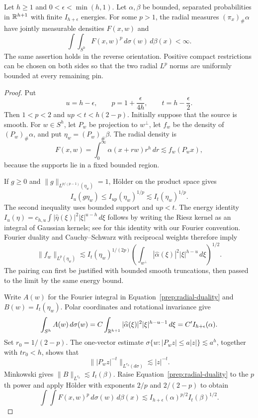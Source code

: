 \begin{lemma}\label{prep:radial-lp}
Let $h\ge1$ and $0<\epsilon<\min(h,1)$. Let $\alpha,\beta$ be
bounded, separated probabilities in $\mathbb R^{h+1}$ with finite
$I_{h+\epsilon}$ energies. For some $p>1$, the radial measures
$(\pi_x)_\#\alpha$ have jointly measurable densities $F(x,w)$ and
\[
 \int\!\int_{S^h}F(x,w)^p\,d\sigma(w)\,d\beta(x)<\infty.
\]
The same assertion holds in the reverse orientation. Positive compact
restrictions can be chosen on both sides so that the two radial
$L^p$ norms are uniformly bounded at every remaining pin.
\end{lemma}
\begin{proof}
Put
\[
 u=h-\epsilon,\qquad p=1+\frac{\epsilon}{4h},
 \qquad t=h-\frac{\epsilon}{2}.
\]
Then $1<p<2$ and $up<t<h(2-p)$. Initially suppose that the
source is smooth. For $w\in S^h$, let $P_w$ be projection to
$w^\perp$, let $f_w$ be the density of $(P_w)_\#\alpha$, and put
$\eta_w=(P_w)_\#\beta$. The radial density is
\[
 F(x,w)=\int_0^\infty\alpha(x+rw)r^h\,dr
 \lesssim f_w(P_wx),
\]
because the supports lie in a fixed bounded region.

If $g\ge0$ and $\|g\|_{L^{p/(p-1)}(\eta_w)}=1$, Hölder on the
product space gives
\[
 I_u(g\eta_w)\le I_{up}(\eta_w)^{1/p}
 \lesssim I_t(\eta_w)^{1/p}.
\]
The second inequality uses bounded support and $up<t$.
The energy identity
$I_u(\eta)=c_{h,u}\int|\widehat\eta(\xi)|^2|\xi|^{u-h}\,d\xi$
follows by writing the Riesz kernel as an integral of Gaussian
kernels; see \cite[Lemma~12.12]{Mattila1995} for this identity with
our Fourier convention. Fourier duality and Cauchy--Schwarz with reciprocal
weights therefore imply
\begin{equation}\label{prep:radial-duality}
 \|f_w\|_{L^p(\eta_w)}
 \lesssim I_t(\eta_w)^{1/(2p)}
 \left(\int_{w^\perp}|\widehat\alpha(\xi)|^2
                       |\xi|^{h-u}\,d\xi\right)^{1/2}.
\end{equation}
The pairing can first be justified with bounded smooth truncations,
then passed to the limit by the same energy bound.

Write $A(w)$ for the Fourier integral in
Equation~\eqref{prep:radial-duality} and $B(w)=I_t(\eta_w)$.
Polar coordinates and rotational invariance give
\[
 \int_{S^h}A(w)\,d\sigma(w)
 =C\int_{\mathbb R^{h+1}}|\widehat\alpha(\xi)|^2
                      |\xi|^{h-u-1}\,d\xi
 =C'I_{h+\epsilon}(\alpha).
\]
Set $r_0=1/(2-p)$. The one-vector estimate
$\sigma\{w:|P_wz|\le a|z|\}\lesssim a^h$, together with
$tr_0<h$, shows that
\[
 \big\||P_wz|^{-t}\big\|_{L^{r_0}(d\sigma)}\lesssim|z|^{-t}.
\]
Minkowski gives $\|B\|_{L^{r_0}}\lesssim I_t(\beta)$.
Raise Equation~\eqref{prep:radial-duality} to the $p$th power and
apply Hölder with exponents $2/p$ and $2/(2-p)$ to obtain
\begin{equation}\label{prep:radial-integrated}
 \int\!\int F(x,w)^p\,d\sigma(w)\,d\beta(x)
 \lesssim I_{h+\epsilon}(\alpha)^{p/2}I_t(\beta)^{1/2}.
\end{equation}


\end{proof}
